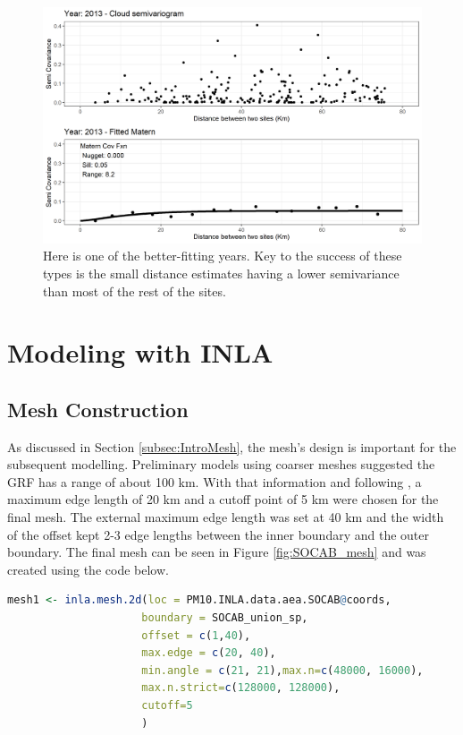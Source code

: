 \documentclass{article}
\begin{document}
\begin{figure}[ht]
    \centering
    \includegraphics[width = 12cm]{Figures/EmpiricalVariograms/Empirical_Variogram_2013.png}
    \caption{Here is one of the better-fitting years.  Key to the success of these types is the small distance estimates having a lower semivariance than most of the rest of the sites.}
    \label{fig:Variogram2013}
\end{figure}

%
\section{Modeling with INLA}
\label{subsec:INLAmodelling}

\subsection{Mesh Construction}
As discussed in Section \ref{subsec:IntroMesh}, the mesh's design is important for the subsequent modelling.  Preliminary models using coarser meshes suggested the \ac{GRF} has a range of about 100 km.   With that information and following \cite{Righetto2020}, a maximum edge length of 20 km and a cutoff point of 5 km were chosen for the final mesh.  The external maximum edge length was set at 40 km and the width of the offset kept 2-3 edge lengths between the inner boundary and the outer boundary.  The final mesh can be seen in Figure \ref{fig:SOCAB_mesh} and was created using the code below.

\begin{lstlisting}[language = R]
mesh1 <- inla.mesh.2d(loc = PM10.INLA.data.aea.SOCAB@coords, 
                     boundary = SOCAB_union_sp,
                     offset = c(1,40),
                     max.edge = c(20, 40),
                     min.angle = c(21, 21),max.n=c(48000, 16000), 
                     max.n.strict=c(128000, 128000), 
                     cutoff=5
                     ) 
\end{lstlisting} \label{code:inlaMesh}
\end{document}
